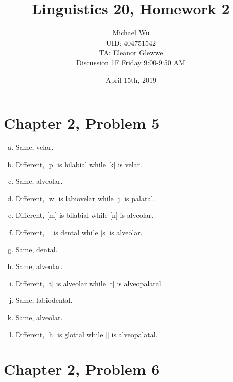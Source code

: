 \documentclass[12pt]{article}
\begin{document}
\title{Linguistics 20, Homework 2}
\date{April 15th, 2019}
\author{Michael Wu\\UID: 404751542\\TA: Eleanor Glewwe\\Discussion 1F Friday 9:00-9:50 AM}
\maketitle

\section*{Chapter 2, Problem 5}

\begin{multicols}{2}
    \begin{enumerate}[a)]
        \item Same, velar.
        \item Different, [p] is bilabial while [k] is velar.
        \item Same, alveolar.
        \item Different, [w] is labiovelar while [j] is palatal.
        \item Different, [m] is bilabial while [n] is alveolar.
        \item Different, [\dh] is dental while [s] is alveolar.
        \item Same, dental.
        \item Same, alveolar.
        \item Different, [t] is alveolar while [t\textesh] is alveopalatal.
        \item Same, labiodental.
        \item Same, alveolar.
        \item Different, [h] is glottal while [\textesh] is alveopalatal.
    \end{enumerate}
\end{multicols}

\section*{Chapter 2, Problem 6}
\end{document}
